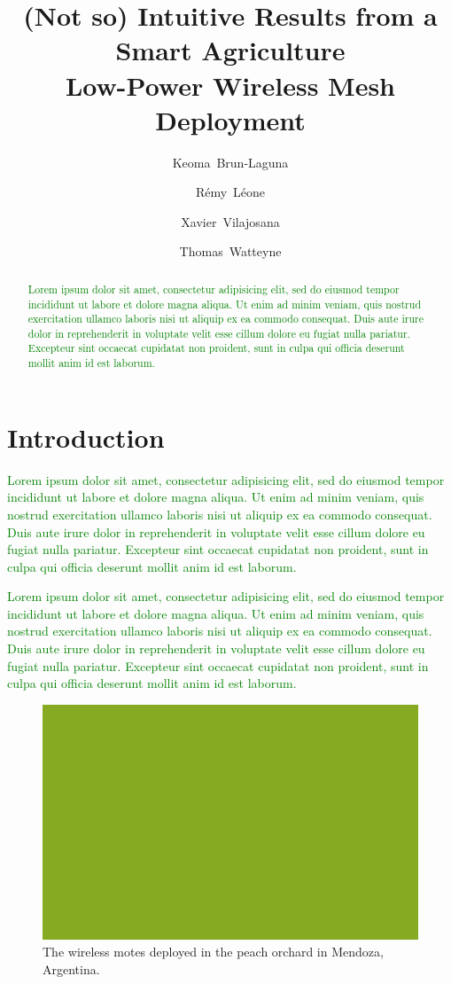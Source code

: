 \documentclass{elsarticle}
\newcommand{\lorem}          {\textcolor{green}{Lorem ipsum dolor sit amet, consectetur adipisicing elit, sed do eiusmod tempor incididunt ut labore et dolore magna aliqua. Ut enim ad minim veniam, quis nostrud exercitation ullamco laboris nisi ut aliquip ex ea commodo consequat. Duis aute irure dolor in reprehenderit in voluptate velit esse cillum dolore eu fugiat nulla pariatur. Excepteur sint occaecat cupidatat non proident, sunt in culpa qui officia deserunt mollit anim id est laborum.}}
\begin{document}
	
\begin{frontmatter}
	
\title{(Not so) Intuitive Results from a Smart Agriculture\\Low-Power Wireless Mesh Deployment}

\author[inria]{Keoma~Brun-Laguna}
\author[inria]{R\'emy~L\'eone}
\author[uoc]{Xavier~Vilajosana}
\author[inria]{Thomas~Watteyne}

\address[inria]{Inria, EVA team, Paris, France}
\address[uoc]{Univ. Oberta de Catalunya, Barcelona, Catalonia, Spain}

\end{frontmatter}

\begin{abstract}
\lorem
\end{abstract}

\section{Introduction}
\label{sec:intro}


\lorem


\lorem

\begin{figure}
    \centering
    \includegraphics[width=\columnwidth]{fake}
    \caption{The wireless motes deployed in the peach orchard in Mendoza, Argentina.}
    \label{fig:orchard}
\end{figure}
\end{document}
